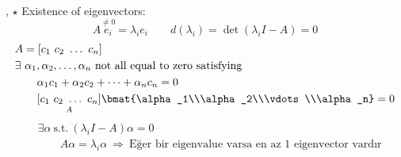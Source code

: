 \sep
$\star$ Existence of eigenvectors:
\[
A\overset{\neq0}{e_i}=\lambda_ie_i\qquad d(\lambda_i)=\det(\lambda_iI-A)=0
\]
\begin{align*}
&A=[c_1\ c_2\ \dots\ c_n]\\
&\exists\ \alpha_1,\alpha_2,\dots,\alpha_n\text{ not all equal to zero satisfying}\\
&\qquad\alpha_1c_1+\alpha_2c_2+\dots+\alpha_nc_n=0\\
&\qquad\underset{A}{[c_1\ c_2\ \dots\ c_n]}\bmat{\alpha_1\\\alpha_2\\\vdots\\\alpha_n}=0
\end{align*}
\begin{align*}
&\exists\alpha\ \text{s.t.}\ (\lambda_iI-A)\alpha=0\\
&\qquad A\alpha=\lambda_i\alpha\ \Rightarrow\ \text{Eğer bir eigenvalue varsa en az 1 eigenvector vardır}
\end{align*}


